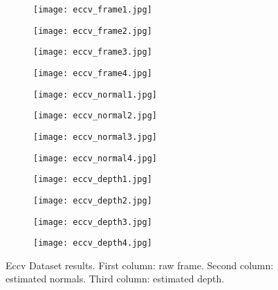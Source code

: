 \documentclass[1p]{elsarticle}
\begin{document}
\begin{figure}[h]
     \centering
     \begin{subfigure}[b]{0.24\textwidth}
         \centering
         \texttt{[image: eccv\_frame1.jpg]}
     \end{subfigure}
     \begin{subfigure}[b]{0.24\textwidth}
         \centering
         \texttt{[image: eccv\_frame2.jpg]}
     \end{subfigure}
     \begin{subfigure}[b]{0.24\textwidth}
         \centering
         \texttt{[image: eccv\_frame3.jpg]}
     \end{subfigure}
     \centering
     \begin{subfigure}[b]{0.24\textwidth}
         \centering
         \texttt{[image: eccv\_frame4.jpg]}
     \end{subfigure}
     \begin{subfigure}[b]{0.24\textwidth}
         \centering
         \texttt{[image: eccv\_normal1.jpg]}
     \end{subfigure}
     \begin{subfigure}[b]{0.24\textwidth}
         \centering
         \texttt{[image: eccv\_normal2.jpg]}
     \end{subfigure}
     \begin{subfigure}[b]{0.24\textwidth}
         \centering
         \texttt{[image: eccv\_normal3.jpg]}
     \end{subfigure}
     \begin{subfigure}[b]{0.24\textwidth}
         \centering
         \texttt{[image: eccv\_normal4.jpg]}
     \end{subfigure}
     \begin{subfigure}[b]{0.24\textwidth}
         \centering
         \texttt{[image: eccv\_depth1.jpg]}
     \end{subfigure}
     \begin{subfigure}[b]{0.24\textwidth}
         \centering
         \texttt{[image: eccv\_depth2.jpg]}
     \end{subfigure}
     \begin{subfigure}[b]{0.24\textwidth}
         \centering
         \texttt{[image: eccv\_depth3.jpg]}
     \end{subfigure}
     \begin{subfigure}[b]{0.24\textwidth}
         \centering
         \texttt{[image: eccv\_depth4.jpg]}
     \end{subfigure}
        \caption{Eccv Dataset results. First column: raw frame. Second column: estimated normals. Third column: estimated depth.}
        \label{fig:eccv_dataset}
\end{figure}
\end{document}
